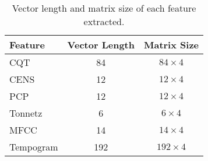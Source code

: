 \begin{table}[t]
    \centering
    \begin{tabular}{|l|c|c|}
    \hline
    \textbf{Feature} & \textbf{Vector Length} & \textbf{Matrix Size}  \\ \hline\hline
    CQT       & 84          & $84\times4$  \\ \hline
    CENS      & 12          & $12\times4$  \\ \hline
    PCP       & 12          & $12\times4$  \\ \hline
    Tonnetz   & 6           & $6\times4$   \\ \hline
    MFCC      & 14          & $14\times4$  \\ \hline
    Tempogram & 192         & $192\times4$ \\ \hline
    \end{tabular}
    \caption{Vector length and matrix size of each feature extracted.}
    \label{tab:feature_sizes}
\end{table}